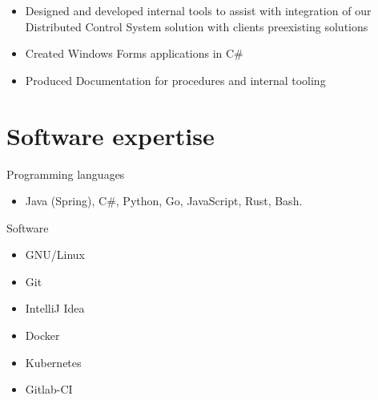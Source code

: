 \documentclass{res}
\newcommand{\inFrench}[1]{}
\newcommand{\inEnglish}[1]{#1}
\begin{document}
\begin{resume}
{	\begin{itemize} \itemsep -2pt
		\item Designed and developed internal tools to assist with integration of our Distributed Control System solution with clients preexisting solutions
		\item Created Windows Forms applications in C\#
		\item Produced Documentation for procedures and internal tooling
	\end{itemize}
}

\inFrench{
	\section{Connaissances informatiques}
}
\inEnglish{
	\section{Software expertise}
}
\vspace{6pt}

%

\inEnglish{
	Programming languages
	\vspace{0.05in}
	\begin{itemize}
		\item Java (Spring), C\#, Python, Go, JavaScript, Rust, Bash.
	\end{itemize}

	Software
	\vspace{0.05in}
	\begin{itemize}\itemsep -2pt
		\item GNU/Linux
		\item Git
		\item IntelliJ Idea
		\item Docker
		\item Kubernetes
		\item Gitlab-CI
	\end{itemize}
}


\end{resume}
\end{document}
